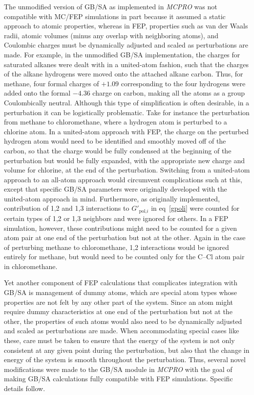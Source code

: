\documentclass[12pt]{report}
\def\equlab{eq}\def\equslab{Eqs.}
\newcommand*\eq[1]{\equlab~\ref{#1}}
\begin{document}
The unmodified version of GB/SA as implemented in \textit{MCPRO} was not compatible with MC/FEP simulations in part because it assumed a static approach to atomic properties, whereas in FEP, properties such as van der Waals radii, atomic volumes (minus any overlap with neighboring atoms), and Coulombic charges must be dynamically adjusted and scaled as perturbations are made. For example, in the unmodified GB/SA implementation, the charges for saturated alkanes were dealt with in a united-atom fashion, such that the charges of the alkane hydrogens were moved onto the attached alkane carbon. Thus, for methane, four formal charges of $+1.09$ corresponding to the four hydrogens were added onto the formal $-4.36$ charge on carbon, making all the atoms as a group Coulombically neutral. Although this type of simplification is often desirable, in a perturbation it can be logistically problematic. Take for instance the perturbation from methane to chloromethane, where a hydrogen atom is perturbed to a chlorine atom. In a united-atom approach with FEP, the charge on the perturbed hydrogen atom would need to be identified and smoothly moved off of the carbon, so that the charge would be fully condensed at the beginning of the perturbation but would be fully expanded, with the appropriate new charge and volume for chlorine, at the end of the perturbation. Switching from a united-atom approach to an all-atom approach would circumvent complications such at this, except that specific GB/SA parameters were originally developed with the united-atom approach in mind. Furthermore, as originally implemented, contribution of 1,2 and 1,3 interactions to $G'_{\textrm{pol,}i}$ in \eq{gpoli} were counted for certain types of 1,2 or 1,3 neighbors and were ignored for others. In a FEP simulation, however, these contributions might need to be counted for a given atom pair at one end of the perturbation but not at the other. Again in the case of perturbing methane to chloromethane, 1,2 interactions would be ignored entirely for methane, but would need to be counted only for the C--Cl atom pair in chloromethane.

Yet another component of FEP calculations that complicates integration with GB/SA is management of dummy atoms, which are special atom types whose properties are not felt by any other part of the system. Since an atom might require dummy characteristics at one end of the perturbation but not at the other, the properties of such atoms would also need to be dynamically adjusted and scaled as perturbations are made. When accommodating special cases like these, care must be taken to ensure that the energy of the system is not only consistent at any given point during the perturbation, but also that the change in energy of the system is smooth throughout the perturbation. Thus, several novel modifications were made to the GB/SA module in \textit{MCPRO} with the goal of making GB/SA calculations fully compatible with FEP simulations. Specific details follow.
\end{document}
